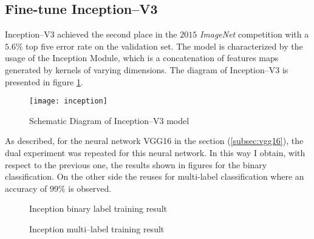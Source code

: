 \subsection{Fine-tune Inception--V3}
\label{subsec:inception}
Inception--V3 achieved the second place in the $2015$ \emph{ImageNet} 
competition with a $5.6 \%$ top five error rate on the validation set. 
The model is characterized by the usage of the Inception Module, which is a 
concatenation of features maps generated by kernels of varying dimensions.
The diagram of Inception--V3 is presented in figure \ref{fig:inceptionV3schema}.
%
\begin{figure}[htb]
\centering
\texttt{[image: inception]}
\caption{Schematic Diagram of Inception--V3 model}
\label{fig:inceptionV3schema}
\end{figure}
%
As described, for the neural network VGG16 in the section (\ref{subsec:vgg16}), 
the dual experiment was repeated for this neural network.
In this way I obtain, with respect to the previous one, the results shown in figures
for the binary classification.
On the other side the reuses for multi-label classification where an accuracy 
of $99\%$ is observed.
%
\begin{figure}[htb]
\centering
{} \quad
{} 
\caption{Inception binary label training result}
\label{fig:inception-result-bin}
\end{figure}
%
\begin{figure}[htb]
\centering
{} \quad
{} 
\caption{Inception multi--label training result}
\label{fig:inception-result-multi}
\end{figure}
%
